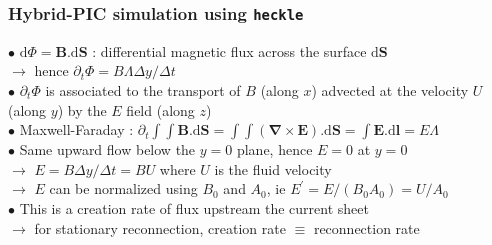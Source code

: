 \documentclass{beamer}
\newcommand{\D}{{\mathrm d}}
\begin{document}
\begin{frame}
\frametitle{Hybrid-PIC simulation using \texttt{heckle}}

\begin{center}

\end{center}


$\bullet$ $\D \Phi = \mathbf B . \D \mathbf S$ : differential magnetic flux across the surface $\D \mathbf S$ \\
$\to$ hence $\partial_t \Phi = B \Lambda \Delta y / \Delta t$ \\
$\bullet$ $\partial_t \Phi$ is associated to the transport of $B$ (along $x$) advected at the velocity $U$ (along $y$) by the $E$ field (along $z$) \\
$\bullet$ Maxwell-Faraday : $\partial_t \int \!\!\! \int \mathbf B . \D \mathbf S = \int \!\!\! \int (\boldsymbol{\nabla} \times \mathbf E) . \D \mathbf S =  \int \mathbf E . \D \mathbf l = E \Lambda$ \\
$\bullet$ Same upward flow below the $y=0$ plane, hence $E = 0$ at $y = 0$ \\
$\to$ $E = B \Delta y / \Delta t = B U$ where $U$ is the fluid velocity \\
$\to$ $E$ can be normalized using $B_0$ and $A_0$, ie $E^{\prime} = E/(B_0 A_0) = U / A_0$ \\
$\bullet$ This is a creation rate of flux upstream the current sheet \\
$\to$ for stationary reconnection, creation rate $\equiv$ reconnection rate \\



\end{frame}
\end{document}
